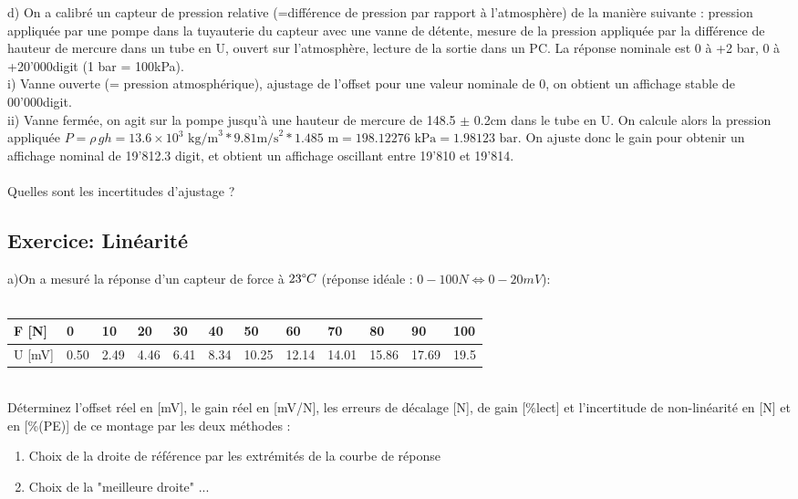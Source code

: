 d)	On a calibré un capteur de pression relative (=différence de pression par rapport à l'atmosphère) de la manière suivante : pression appliquée par une pompe dans la tuyauterie du capteur avec une vanne de détente, mesure de la pression appliquée par la différence de hauteur de mercure dans un tube en U, ouvert sur l'atmosphère, lecture de la sortie dans un PC. La réponse nominale est 0 à +2 bar, 0 à +20'000digit (1 bar = 100kPa). \\
i)	Vanne ouverte (= pression atmosphérique), ajustage de l'offset pour une valeur nominale de 0, on obtient un affichage stable de 00'000digit. \\
ii)	Vanne fermée, on agit sur la pompe jusqu'à une hauteur de mercure de 148.5 $\pm$ 0.2cm dans le tube en U. On calcule alors la pression appliquée $P=\rho\,gh = 13.6\times10^3 \text{ kg/m}^3 * 9.81\text {m/s}^2 * 1.485\text{ m}=198.12276\text{ kPa} = 1.98123\text{ bar}$. On ajuste donc le gain pour obtenir un affichage nominal de 19'812.3 digit, et obtient un affichage oscillant entre 19'810 et 19'814. \\ ~\\
Quelles sont les incertitudes d'ajustage ?

\subsection{Exercice: Linéarité}

a)On a mesuré la réponse d'un capteur de force à $23 \degree C$ (réponse idéale : $0-100N \Leftrightarrow 0-20 mV$):\\
~
\\
\begin{tabular}{|l|l|l|l|l|l|l|l|l|l|l|l|}
    \hline
    F [N]  & 0    & 10   & 20   & 30   & 40   & 50    & 60    & 70    & 80    & 90    & 100  \\
    \hline
    U [mV] & 0.50 & 2.49 & 4.46 & 6.41 & 8.34 & 10.25 & 12.14 & 14.01 & 15.86 & 17.69 & 19.5 \\
    \hline
\end{tabular}
\\

Déterminez l'offset réel en [mV], le gain réel en [mV/N], les erreurs de décalage [N], de gain [\%lect] et l'incertitude de non-linéarité en [N] et en [\%(PE)] de ce montage par les deux méthodes :
\begin{enumerate}
    \item Choix de la droite de référence par les extrémités de la courbe de réponse
    \item Choix de la "meilleure droite"	 ...
\end{enumerate}
~\\

